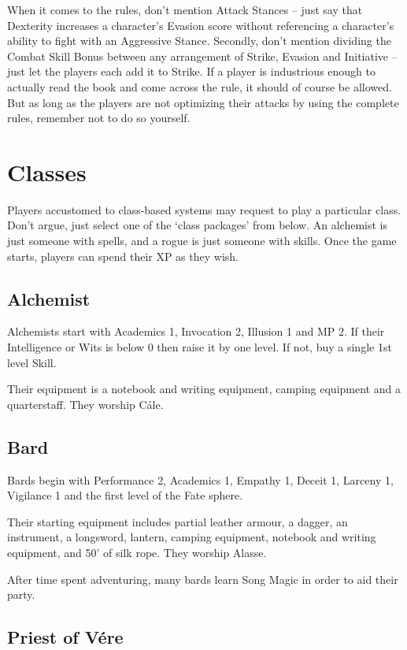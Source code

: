 When it comes to the rules, don't mention Attack Stances -- just say that Dexterity increases a character's Evasion score without referencing a character's ability to fight with an Aggressive Stance.  Secondly, don't mention dividing the Combat Skill Bonus between any arrangement of Strike, Evasion and Initiative -- just let the players each add it to Strike. If a player is industrious enough to actually read the book and come across the rule, it should of course be allowed. But as long as the players are not optimizing their attacks by using the complete rules, remember not to do so yourself.

\section{Classes}

Players accustomed to class-based systems may request to play a particular class. Don't argue, just select one of the `class packages' from below.  An alchemist is just someone with spells, and a rogue is just someone with skills.  Once the game starts, players can spend their XP as they wish.

\subsection{Alchemist}

Alchemists start with Academics 1, Invocation 2, Illusion 1 and MP 2.  If their Intelligence or Wits is below 0 then raise it by one level.  If not, buy a single 1st level Skill.

Their equipment is a notebook and writing equipment, camping equipment and a quarterstaff. They worship C\'{a}le.

\subsection{Bard}

Bards begin with Performance 2, Academics 1, Empathy 1, Deceit 1, Larceny 1, Vigilance 1 and the first level of the Fate sphere.

Their starting equipment includes partial leather armour, a dagger, an instrument, a longsword, lantern, camping equipment, notebook and writing equipment, and 50' of silk rope.  They worship Alasse.

After time spent adventuring, many bards learn Song Magic in order to aid their party.

\subsection{Priest of V\'{e}re}

